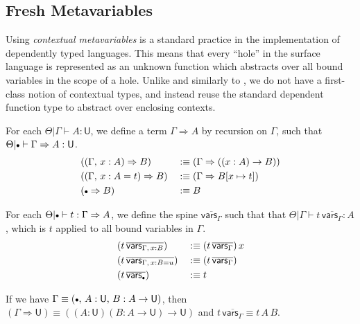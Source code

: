 \documentclass[acmsmall,screen,dvipsnames]{acmart}\settopmatter{}
\renewcommand{\U}{\mathsf{U}}
\newcommand{\emptycon}{\scaleobj{.75}\bullet}
\newcommand{\To}{\Rightarrow}
\theoremstyle{remark}
\begin{document}
\subsection{Fresh Metavariables}

Using \emph{contextual metavariables} is a standard practice in the
implementation of dependently typed languages. This means that every ``hole'' in
the surface language is represented as an unknown function which abstracts over
all bound variables in the scope of a hole. Unlike \citet{nanevski2008contextual}
and similarly to \citet{gundry2013type}, we do not have a first-class notion of
contextual types, and instead reuse the standard dependent function type to
abstract over enclosing contexts.

\begin{definition}\label{def:closingtype} For each $\Theta|\Gamma \vdash A : \U$, we define a term $\Gamma \To A$ by recursion on $\Gamma$, such that $\Theta|\emptycon\vdash
  \Gamma \To A : \U$.
  \begin{alignat*}{3}
    &((\Gamma,\, x : A) \To B)     && :\equiv (\Gamma \To ((x : A) \to B))\\
    &((\Gamma,\, x : A = t) \To B) && :\equiv (\Gamma \To B[x\mapsto t])\\
    &(\emptycon \To B)             && :\equiv B
  \end{alignat*}
\end{definition}

\begin{definition}[Contextualization]\label{def:contextualization}
For each $\Theta|\emptycon \vdash t : \Gamma\To A$, we define the spine
$\overline{\mathsf{vars}_{\Gamma}}$ such that that $\Theta|\Gamma\vdash
t\,\overline{\mathsf{vars}_{\Gamma}} : A$, which is $t$ applied to all bound
variables in $\Gamma$.
  \begin{alignat*}{3}
    &(t\,\overline{\mathsf{vars}_{\Gamma,\,x:B}})   && :\equiv (t\,\overline{\mathsf{vars}_{\Gamma}})\,x \\
    &(t\,\overline{\mathsf{vars}_{\Gamma,\,x:B=u}}) && :\equiv (t\,\overline{\mathsf{vars}_{\Gamma}}) \\
    &(t\,\overline{\mathsf{vars}_{\emptycon}})     && :\equiv t
  \end{alignat*}
\end{definition}

\begin{example} If we have $\Gamma \equiv (\emptycon,\,A : \U,\,B : A \to \U)$, then
$(\Gamma \To \U) \equiv ((A : \U)(B : A \to \U) \to \U)$ and
$t\,\overline{\mathsf{vars}_{\Gamma}} \equiv t\,A\,B$.
\end{example}
\end{document}
